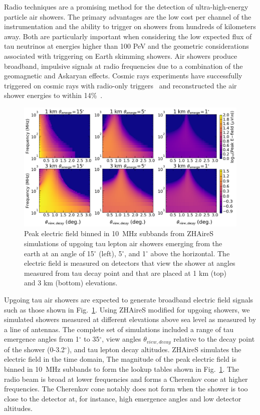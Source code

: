 \documentclass{PoS}
\begin{document}
Radio techniques are a promising method for the detection of ultra-high-energy particle air showers. The primary advantages are the low cost per channel of the instrumentation and the ability to trigger on showers from hundreds of kilometers away. Both are particularly important when considering the low expected flux of tau neutrinos at energies higher than 100 PeV and the geometric considerations associated with triggering on Earth skimming showers. Air showers produce broadband, impulsive signals at radio frequencies due to a combination of the geomagnetic and Askaryan effects. Cosmic rays experiments have successfully triggered on cosmic rays with radio-only triggers~\cite{TREND, OVRO-LWA} and reconstructed the air shower energies to within 14\%~\cite{AERA}.

\begin{figure}[htbp]
\begin{center}
\includegraphics[width=\textwidth]{figures/efield_sims_mountainonly_logscale}
\caption{Peak electric field binned in 10~MHz subbands from ZHAireS simulations of upgoing tau lepton air showers emerging from the earth at an angle of 15$^{\circ}$ (left), 5$^{\circ}$, and 1$^{\circ}$ above the horizontal. The electric field is measured on detectors that view the shower at angles measured from tau decay point and that are placed at 1 km (top) and 3 km (bottom) elevations. }
\label{fig:efield}
\end{center}
\end{figure}

Upgoing tau air showers are expected to generate broadband electric field signals such as those shown in Fig.~\ref{fig:efield}. Using ZHAireS modified for upgoing showers, we simulated showers measured at different elevations above sea level as measured by a line of antennas. The complete set of simulations included a range of tau emergence angles from 1$^{\circ}$ to 35$^{\circ}$, view angles $\theta_{view,decay}$ relative to the decay point of the shower (0-3.2$^{\circ}$), and tau lepton decay altitudes. ZHAireS simulates the electric field in the time domain, The magnitude of the peak electric field is binned in 10~MHz subbands to form the lookup tables shown in  Fig.~\ref{fig:efield}. The radio beam is broad at lower frequencies and forms a Cherenkov cone at higher frequencies. The Cherenkov cone notably does not form when the shower is too close to the detector at, for instance, high emergence angles and low detector altitudes. 
\end{document}

